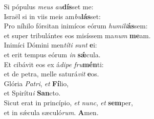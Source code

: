 \evenverse Si pópulus \textit{me}\textit{us} \textit{au}\textbf{dís}set me:~\*\\
\evenverse Israël si in viis meis am\textit{bu}\textbf{lás}set:\\
\oddverse Pro níhilo fórsitan inimícos eórum \textit{hu}\textit{mi}\textit{li}\textbf{ás}sem:~\*\\
\oddverse et super tribulántes eos misíssem ma\textit{num} \textbf{me}am.\\
\evenverse Inimíci Dómini men\textit{tí}\textit{ti} \textit{sunt} \textbf{e}i:~\*\\
\evenverse et erit tempus eórum \textit{in} \textbf{sǽ}cula.\\
\oddverse Et cibávit eos ex á\textit{di}\textit{pe} \textit{fru}\textbf{mén}ti:~\*\\
\oddverse et de petra, melle saturá\textit{vit} \textbf{e}os.\\
\evenverse Glória \textit{Pa}\textit{tri}, \textit{et} \textbf{Fí}lio,~\*\\
\evenverse et Spirítu\textit{i} \textbf{San}cto.\\
\oddverse Sicut erat in princípio, \textit{et} \textit{nunc}, \textit{et} \textbf{sem}per,~\*\\
\oddverse et in sǽcula sæculó\textit{rum}. \textbf{A}men.\\
